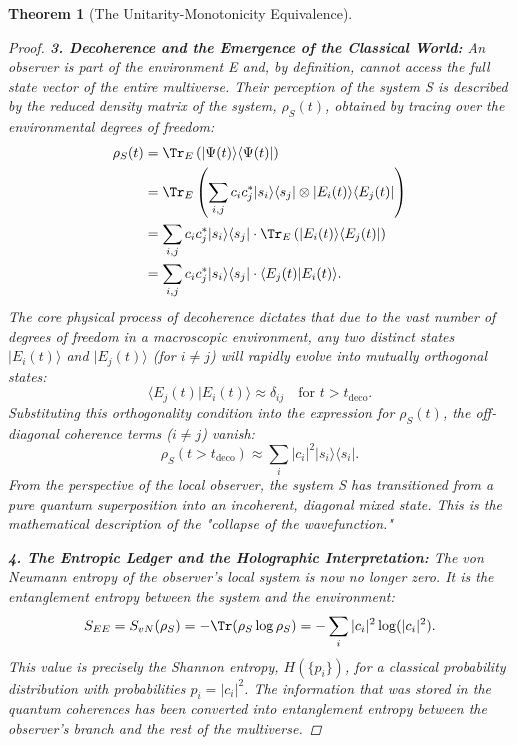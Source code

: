 \documentclass[11pt, letterpaper]{report}
\theoremstyle{plain} %
\newtheorem{theorem}{Theorem}[chapter]
\theoremstyle{definition} %
\theoremstyle{remark} %
\begin{document}
\begin{theorem}[The Unitarity-Monotonicity Equivalence]
\begin{proof}
\textbf{3. Decoherence and the Emergence of the Classical World:}
An observer is part of the environment E and, by definition, cannot access the full state vector of the entire multiverse. Their perception of the system S is described by the reduced density matrix of the system, $\rho_S(t)$, obtained by tracing over the environmental degrees of freedom:
\begin{align}
    \rho_S(t) &= \Tr_E\left(|\Psi(t)\rangle\langle\Psi(t)|\right) \\
    &= \Tr_E\left( \sum_{i,j} c_i c_j^* |s_i\rangle\langle s_j| \otimes |E_i(t)\rangle\langle E_j(t)| \right) \\
    &= \sum_{i,j} c_i c_j^* |s_i\rangle\langle s_j| \cdot \Tr_E\left( |E_i(t)\rangle\langle E_j(t)| \right) \\
    &= \sum_{i,j} c_i c_j^* |s_i\rangle\langle s_j| \cdot \langle E_j(t)|E_i(t)\rangle.
\end{align}
The core physical process of decoherence dictates that due to the vast number of degrees of freedom in a macroscopic environment, any two distinct states $|E_i(t)\rangle$ and $|E_j(t)\rangle$ (for $i \neq j$) will rapidly evolve into mutually orthogonal states:
\begin{equation}
    \langle E_j(t)|E_i(t)\rangle \approx \delta_{ij} \quad \text{for } t > t_{\text{deco}}.
\end{equation}
Substituting this orthogonality condition into the expression for $\rho_S(t)$, the off-diagonal coherence terms ($i \neq j$) vanish:
\begin{equation}
    \rho_S(t > t_{\text{deco}}) \approx \sum_i |c_i|^2 |s_i\rangle\langle s_i|.
    \label{eq:decohered_rho_s}
\end{equation}
From the perspective of the local observer, the system S has transitioned from a pure quantum superposition into an incoherent, diagonal mixed state. This is the mathematical description of the "collapse of the wavefunction."

\textbf{4. The Entropic Ledger and the Holographic Interpretation:}
The von Neumann entropy of the observer's local system is now no longer zero. It is the entanglement entropy between the system and the environment:
\begin{equation}
    S_{EE} = S_{vN}(\rho_S) = -\Tr(\rho_S \log\rho_S) = -\sum_i |c_i|^2 \log(|c_i|^2).
\end{equation}
This value is precisely the Shannon entropy, $H(\{p_i\})$, for a classical probability distribution with probabilities $p_i=|c_i|^2$. The information that was stored in the quantum coherences has been converted into entanglement entropy between the observer's branch and the rest of the multiverse.


\end{proof}
\end{theorem}
\end{document}
